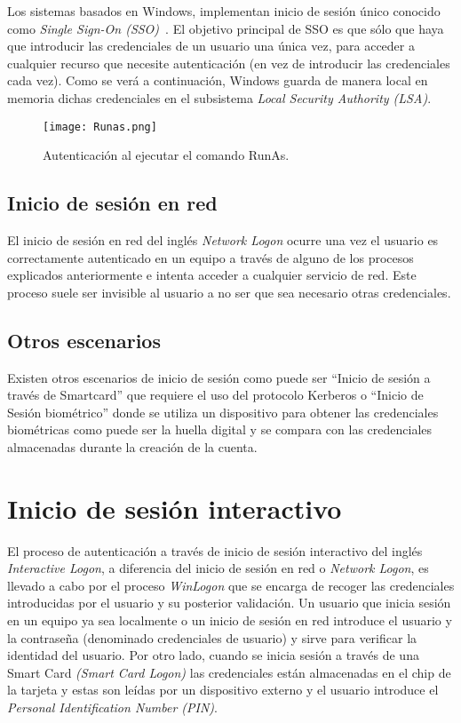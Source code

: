 Los sistemas basados en Windows, implementan inicio de sesión único conocido como {\it Single Sign-On (SSO)}~\cite{Capitulo2:SingleSignOn}. El objetivo principal de SSO es que sólo que haya que introducir las credenciales de un usuario una única vez, para acceder a cualquier recurso que necesite autenticación (en vez de introducir las credenciales cada vez). Como se verá a continuación, Windows guarda de manera local en memoria dichas credenciales en el subsistema {\it Local Security Authority (LSA)}.

\begin{figure}[t!] %
\begin{center}
\texttt{[image: Runas.png]}
\end{center}
\caption{Autenticación al ejecutar el comando RunAs.}
\label{RunAs}
\end{figure}

\subsection{Inicio de sesión en red}

El inicio de sesión en red del inglés {\it Network Logon} ocurre una vez el usuario es correctamente autenticado en un equipo a través de alguno de los procesos explicados anteriormente e intenta acceder a cualquier servicio de red. Este proceso suele ser invisible al usuario a no ser que sea necesario otras credenciales. 

\subsection{Otros escenarios}

Existen otros escenarios de inicio de sesión como puede ser ``Inicio de sesión a través de Smartcard'' que requiere el uso del protocolo Kerberos o ``Inicio de Sesión biométrico'' donde se utiliza un dispositivo para obtener las credenciales biométricas como puede ser la huella digital y se compara con las credenciales almacenadas durante la creación de la cuenta.  

\section{Inicio de sesión interactivo}

El proceso de autenticación a través de inicio de sesión interactivo del inglés {\it Interactive Logon}, a diferencia del inicio de sesión en red o {\it Network Logon}, es llevado a cabo por el proceso {\it WinLogon} que se encarga de recoger las credenciales introducidas por el usuario y su posterior validación. Un usuario que inicia sesión en un equipo ya sea localmente o un inicio de sesión en red introduce el usuario y la contraseña (denominado credenciales de usuario) y sirve para verificar la identidad del usuario. Por otro lado, cuando se inicia sesión a través de una Smart Card {\it (Smart Card Logon)} las credenciales están almacenadas en el chip de la tarjeta y estas son leídas por un dispositivo externo y el usuario introduce el {\it Personal Identification Number (PIN)}.\\

